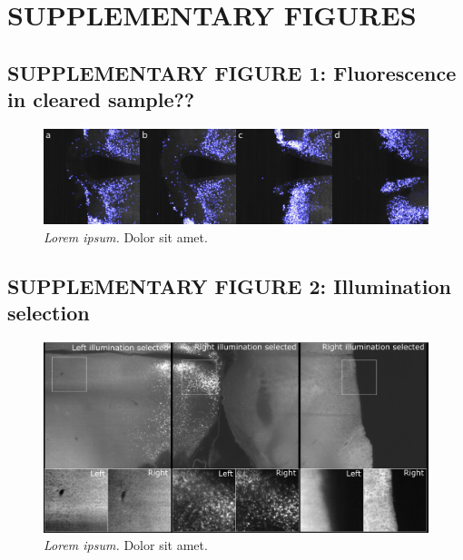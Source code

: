 \documentclass[]{spie}  %
\begin{document}
\pagebreak

\section*{SUPPLEMENTARY FIGURES}


\subsection*{SUPPLEMENTARY FIGURE 1: Fluorescence in cleared sample??}
\vspace{1mm}
\begin{figure}[h!]
\includegraphics[width=\textwidth]{fig-rf.png}
\vspace{-2.0mm}
\caption{\hspace{-0.5mm} \emph{Lorem ipsum.} Dolor sit amet.
}
\label{fig:sup-fig-rf}
\end{figure}

\pagebreak


\subsection*{SUPPLEMENTARY FIGURE 2: Illumination selection}
\vspace{1mm}
\begin{figure}[h!]
\includegraphics[width=\textwidth]{Illu_Select.png}
\vspace{-2.0mm}
\caption{\hspace{-0.5mm} \emph{Lorem ipsum.} Dolor sit amet.
}
\label{fig:sup-fig-illu-select}
\end{figure}
\end{document}
